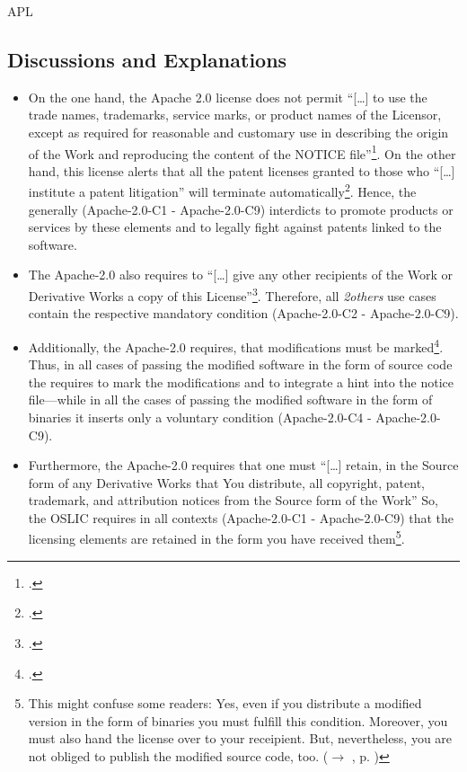 \begin{license}{APL}
\subsection{Discussions and Explanations}
\label{APLDiscussion}
\begin{itemize}
  \item On the one hand, the Apache 2.0 license does not permit
  \enquote{[\ldots] to use the trade names, trademarks, service marks, or
  product names of the Licensor, except as required for reasonable and customary
  use in describing the origin of the Work and reproducing the content of the
  NOTICE file}\footcite[cf.][\nopage wp.\ §6]{Apl20OsiLicense2004a}. On the other
  hand, this license alerts that all the patent licenses granted to those who
  \enquote{[\ldots] institute a patent litigation} will terminate
  automatically\footcite[cf.][\nopage wp.\ §3]{Apl20OsiLicense2004a}. Hence, the
  \oslic{} generally (Apache-2.0-C1 - Apache-2.0-C9) interdicts to promote products or services by
  these elements and to legally fight against patents linked to the software.
  
  \item The Apache-2.0 also requires to \enquote{[\ldots] give any other recipients of
  the Work or Derivative Works a copy of this License}\footcite[cf.][\nopage wp.\
  §4.1]{Apl20OsiLicense2004a}. Therefore, all \emph{2others} use cases contain
  the respective mandatory condition (Apache-2.0-C2 - Apache-2.0-C9).
   
  \item Additionally, the Apache-2.0 requires, that modifications must be
  marked\footcite[cf.][\nopage wp.\ §4.2]{Apl20OsiLicense2004a}. Thus, in all
  cases of passing the modified software in the form of source code the \oslic{}
  requires to mark the modifications and to integrate a hint into the notice
  file---while in all the cases of passing the modified software in the form of
  binaries it inserts only a voluntary condition (Apache-2.0-C4 - Apache-2.0-C9).
  
  \item Furthermore, the Apache-2.0 requires that one must \enquote{[\ldots] retain, in
  the Source form of any Derivative Works that You distribute, all copyright,
  patent, trademark, and attribution notices from the Source form of the Work}
  So, the OSLIC requires in all contexts (Apache-2.0-C1 - Apache-2.0-C9) that the licensing
  elements are retained in the form you have received them\footnote{This might
  confuse some readers: Yes, even if you distribute a modified version in the
  form of binaries you must fulfill this condition. Moreover, you must also hand
  the license over to your receipient. But, nevertheless, you are not obliged to
  publish the modified source code, too. ($\rightarrow$ \oslic, p.
  \protectionpageref{APL})}.
  

\end{itemize}
\end{license}
